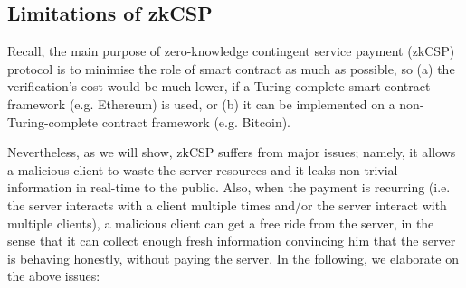 
\subsection{Limitations of zkCSP}

Recall,  the main purpose of zero-knowledge contingent service payment (zkCSP) protocol \cite{CampanelliGGN17}  is to minimise the role of smart contract as much as possible, so  (a) the verification's cost would be much lower, if a Turing-complete smart contract framework (e.g. Ethereum) is used, or (b) it can be implemented on  a non-Turing-complete contract framework (e.g. Bitcoin).   


Nevertheless, as we will show,  zkCSP suffers from  major issues; namely, it allows a malicious client to waste the server resources and  it leaks non-trivial information in real-time to the public. Also, when the payment is recurring (i.e. the server interacts with a client multiple times and/or the server interact with multiple clients), a malicious client can get a free ride from the server, in the sense that it can collect enough fresh information convincing him that the server is behaving honestly, without paying the server. In the following, we elaborate on the  above issues: 




